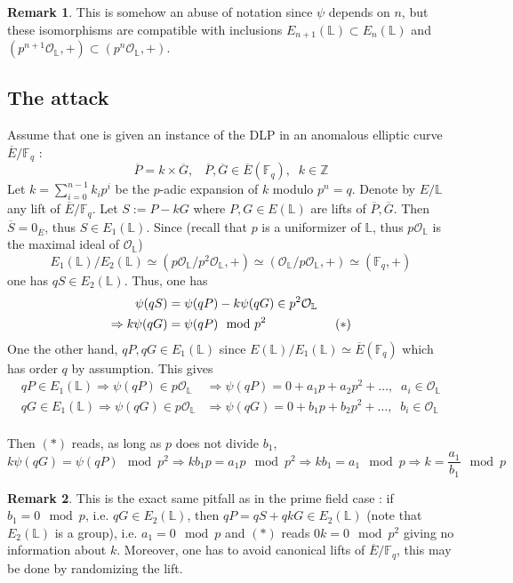 \documentclass[10pt]{article}
\theoremstyle{definition}
\newtheorem{remark}{Remark}
\newcommand{\F}{\mathbb{F}}
\renewcommand{\L}{\mathbb{L}}
\newcommand{\Z}{\mathbb{Z}}
\begin{document}
\begin{remark}
This is somehow an abuse of notation since $\psi$ depends on $n$, but these isomorphisms are compatible with inclusions $E_{n+1}(\L) \subset E_n(\L)$ and $(p^{n+1}\mathcal{O}_{\L},+) \subset (p^n\mathcal{O}_{\L},+)$. 
\end{remark}

\subsection{The attack}

\noindent Assume that one is given an instance of the DLP in an anomalous elliptic curve $\overline{E}/\F_q$ : 
\[ \overline{P} = k \times \overline{G}, \; \; \;  \overline{P}, \overline{G} \in \overline{E}(\F_q), \; \; k \in \Z \]
Let $k = \sum_{i = 0}^{n-1} k_i p^i$ be the $p$-adic expansion of $k$ modulo $p^n = q$.
Denote by $E/\L$ any lift of $\overline{E}/\F_q$.
Let $S := P-kG$ where $P,G \in E(\L)$ are lifts of $\overline{P},\overline{G}$.
Then $\overline{S} = 0_{\overline{E}}$, thus $S \in E_1(\L)$.
Since (recall that $p$ is a uniformizer of $\L$, thus $p\mathcal{O}_{\L}$ is the maximal ideal of $\mathcal{O}_{\L}$)
\[E_1(\L) /E_2(\L) \simeq (p\mathcal{O}_{\L}/ p^2\mathcal{O}_{\L},+) \simeq (\mathcal{O}_{\L}/p\mathcal{O}_{\L},+) \simeq (\F_q,+)\]
one has $qS \in E_2(\L)$.
Thus, one has
\begin{align*} \psi(qS) &=     \psi(qP) - k  \psi(qG) \in p^2\mathcal{O}_{\L} \\
 \Rightarrow k\psi(qG) &= \psi(qP) \mod p^2  \mkern100mu(*) \end{align*}
One the other hand, $qP, qG \in E_1(\L)$ since $E(\L) / E_1(\L) \simeq \overline{E}(\F_q)$ which has order $q$ by assumption.
This gives 
\begin{align*}
qP \in E_1(\L) \Rightarrow \psi(qP) \in p\mathcal{O}_{\L} &\Rightarrow \psi(qP) = 0 + a_1p+ a_2p^2+ \dots, \; \; a_i \in \mathcal{O}_{\L} \\
qG \in E_1(\L) \Rightarrow \psi(qG) \in p\mathcal{O}_{\L} &\Rightarrow \psi(qG) = 0 + b_1p+ b_2p^2+ \dots, \; \; b_i \in \mathcal{O}_{\L} \\
\end{align*}

\noindent Then $(*)$ reads, as long as $p$ does not divide $b_1$,
\[ k\psi(qG) = \psi(qP) \mod p^2 \Rightarrow kb_1p = a_1p \mod p^2 \Rightarrow kb_1 = a_1 \mod p \Rightarrow k = \frac{a_1}{b_1} \mod p \]

\begin{remark}
This is the exact same pitfall as in the prime field case : if $b_1 = 0 \mod p$, i.e. $qG \in E_2(\L)$, then $qP = qS + qkG \in E_2(\L)$ (note that $E_2(\L)$ is a group), i.e. $a_1 = 0 \mod p$ and $(*)$ reads $0k = 0 \mod p^2$ giving no information about $k$.
Moreover, one has to avoid canonical lifts of $\overline{E}/\F_q$, this may be done by randomizing the lift. 
\end{remark}
\end{document}
